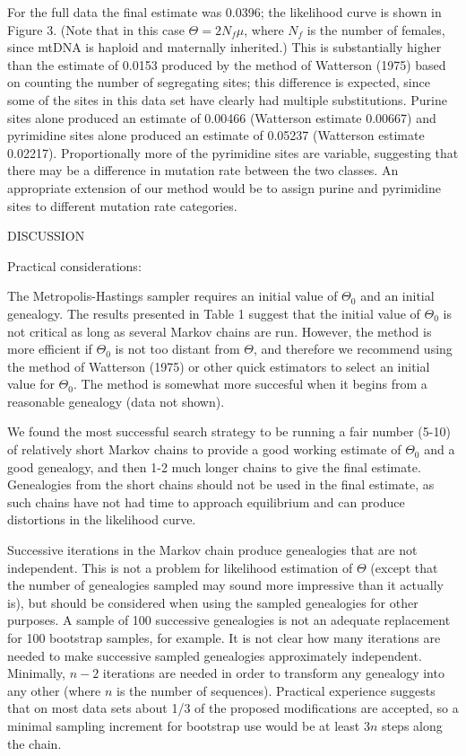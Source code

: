 \documentclass[12pt]{article}
\begin{document}
For the full data the final estimate was 0.0396; the likelihood
curve is shown in Figure 3.  
(Note that in this case $\Theta=2N_f\mu$, where $N_f$ is the number of females,
since mtDNA is haploid and maternally inherited.)
This is substantially higher than the
estimate of 0.0153 produced by the method of {\sc Watterson} (1975) based on
counting the number of segregating sites; this difference is expected, 
since some of the sites in this data set have clearly had multiple
substitutions.
Purine sites alone produced an estimate of 0.00466 (Watterson estimate 
0.00667) and pyrimidine sites alone produced an estimate of 0.05237
(Watterson estimate 0.02217).  Proportionally more of the pyrimidine sites are
variable, suggesting that there may be a difference in mutation rate
between the two classes.  An appropriate extension of our method would
be to assign purine and pyrimidine sites to different mutation rate categories.

\bigskip
\begin{center}
DISCUSSION
\bigskip
\end{center}

\begin{bf}
Practical considerations:
\end{bf}
The Metropolis-Hastings sampler requires an initial 
value of $\Theta_0$ and an initial genealogy.  The results presented in 
Table 1 suggest that the initial value of $\Theta_0$ is not critical as
long as several Markov chains are run.  However, the method is more
efficient if $\Theta_0$ is not too distant from $\Theta$, and therefore
we recommend using the method of {\sc Watterson} (1975) or other quick
estimators to select an initial value for $\Theta_0$.
The method is somewhat more succesful when it begins from a reasonable
genealogy (data not shown). 

We found the most successful search strategy to be running a fair number
(5-10) of relatively short Markov chains to provide a good working estimate
of $\Theta_0$ and a good genealogy, and then 1-2 much longer chains to
give the final estimate.  Genealogies from the short chains should not
be used in the final estimate, as such chains have not had time to
approach equilibrium and can produce distortions in the likelihood
curve.

Successive iterations in the Markov chain produce genealogies that are
not independent.  This is not a problem for likelihood estimation of
$\Theta$ (except that the number of genealogies sampled may sound more
impressive than it actually is), but should be considered when using the
sampled genealogies for other purposes.  A sample of 100 successive
genealogies is not an adequate replacement for 100 bootstrap samples,
for example.  It is not clear how many iterations are needed to make
successive sampled genealogies approximately independent.
Minimally, $n-2$ iterations are needed in order to
transform any genealogy into any other (where $n$ is the number of
sequences).
Practical experience suggests that on most data sets
about 1/3 of the proposed modifications are accepted, so a minimal
sampling increment for bootstrap use would be at least $3n$ steps
along the chain.
\end{document}
